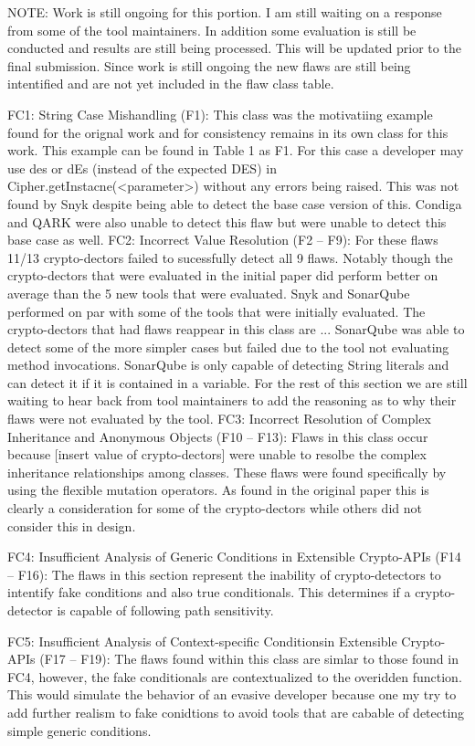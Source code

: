 NOTE: Work is still ongoing for this portion. I am still waiting on a response from some of the tool maintainers. In addition some evaluation is still be conducted and results are still being processed. This will be updated prior to the final submission. Since work is still ongoing the new flaws are still being intentified and are not yet included in the flaw class table.

FC1: String Case Mishandling (F1): This class was the motivatiing example found for the orignal work and for consistency remains in its own class for this work. This example can be found in Table 1 as F1. For this case a developer may use des or dEs (instead of the expected DES) in Cipher.getInstacne(<parameter>) without any errors being raised. This was not found by Snyk despite being able to detect the base case version of this. Condiga and QARK were also unable to detect this flaw but were unable to detect this base case as well.
FC2: Incorrect Value Resolution (F2 – F9): For these flaws 11/13 crypto-dectors failed to sucessfully detect all 9 flaws. Notably though the crypto-dectors that were evaluated in the initial paper did perform better on average than the 5 new tools that were evaluated. Snyk and SonarQube performed on par with some of the tools that were initially evaluated. The crypto-dectors that had flaws reappear in this class are ... 
SonarQube was able to detect some of the more simpler cases but failed due to the tool not evaluating method invocations. SonarQube is only capable of detecting String literals and can detect it if it is contained in a variable. 
For the rest of this section we are still waiting to hear back from tool maintainers to add the reasoning as to why their flaws were not evaluated by the tool.
FC3: Incorrect Resolution of Complex Inheritance and Anonymous Objects (F10 – F13): Flaws in this class occur because [insert value of crypto-dectors] were unable to resolbe the complex inheritance relationships among classes. These flaws were found specifically by using the flexible mutation operators. As found in the original paper this is clearly a consideration for some of the crypto-dectors while others did not consider this in design. 

FC4: Insufficient Analysis of Generic Conditions in Extensible Crypto-APIs (F14 – F16): The flaws in this section represent the inability of crypto-detectors to intentify fake conditions and also true conditionals. This determines if a crypto-detector is capable of following path sensitivity.

FC5: Insufficient Analysis of Context-specific Conditionsin Extensible Crypto-APIs (F17 – F19): The flaws found within this class are simlar to those found in FC4, however, the fake conditionals are contextualized to the overidden function. This would simulate the behavior of an evasive developer because one my try to add further realism to fake conidtions to avoid tools that are cabable of detecting simple generic conditions.


